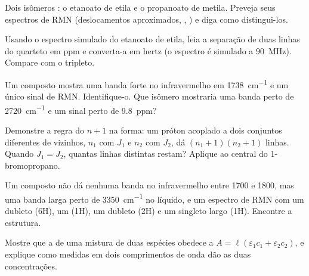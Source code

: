 \begin{exercise}[$\star\star$]\label{exo:b1:structure-spectroscopy:7}
Dois isômeros : o etanoato de etila e o propanoato de metila.
Preveja seus espectros de RMN (deslocamentos aproximados,
, ) e diga como distingui-los.
\end{exercise}

\begin{exercise}[$\star\star$]\label{exo:b1:structure-spectroscopy:8}
Usando o espectro simulado do etanoato de etila, leia a separação de duas
linhas do quarteto em ppm e converta-a em hertz (o espectro é simulado a
\qty{90}{MHz}). Compare com o tripleto.
\end{exercise}

\begin{exercise}[$\star\star$]\label{exo:b1:structure-spectroscopy:9}
Um composto  mostra uma banda forte no infravermelho em
\qty{1738}{cm^{-1}} e um único sinal de RMN. Identifique-o. Que isômero
mostraria uma banda perto de \qty{2720}{cm^{-1}} e um sinal perto de
\qty{9.8}{ppm}?
\end{exercise}

\begin{exercise}[$\star\star\star$]\label{exo:b1:structure-spectroscopy:10}
Demonstre a regra do $n + 1$ na forma: um próton acoplado a dois
conjuntos diferentes de vizinhos, $n_1$ com $J_1$ e $n_2$ com $J_2$, dá
$(n_1 +
1)(n_2 + 1)$ linhas. Quando $J_1 = J_2$, quantas linhas distintas
restam? Aplique ao  central do 1-bromopropano.
\end{exercise}

\begin{exercise}[$\star\star\star$]\label{exo:b1:structure-spectroscopy:11}
Um composto  não dá nenhuma banda no infravermelho entre 1700
e 1800, mas uma banda larga perto de \qty{3350}{cm^{-1}} no líquido, e um
espectro de RMN com um dubleto (6H), um  (1H), um dubleto (2H)
e um singleto largo (1H). Encontre a estrutura.
\end{exercise}

\begin{exercise}[$\star\star\star$]\label{exo:b1:structure-spectroscopy:12}
Mostre que a  de uma mistura de duas espécies obedece a
$A = \ell(\varepsilon_1c_1
+ \varepsilon_2c_2)$, e explique como medidas em dois comprimentos de onda
dão as duas concentrações.
\end{exercise}


